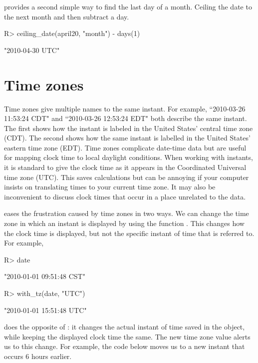 \documentclass[article]{jss}
\begin{document}
 provides a second simple way to find the last day of a month. Ceiling the date to the next month and then subtract a day.

\begin{CodeInput}
R> ceiling_date(april20, "month") - days(1)
\end{CodeInput}
\begin{CodeOutput}
[1] "2010-04-30 UTC"
\end{CodeOutput}


\section{Time zones}
\label{sec:tz}

Time zones give multiple names to the same instant. For example, ``2010-03-26 11:53:24 CDT" and ``2010-03-26 12:53:24 EDT" both describe the same instant. The first shows how the instant is labeled in the United States' central time zone (CDT). The second shows how the same instant is labelled in the United States' eastern time zone (EDT). Time zones complicate date-time data but are useful for mapping clock time to local daylight conditions. When working with instants, it is standard to give the clock time as it appears in the Coordinated Universal time zone (UTC).  This saves calculations but can be annoying if your computer insists on translating times to your current time zone.  It may also be inconvenient to discuss clock times that occur in a place unrelated to the data.

 eases the frustration caused by time zones in two ways. We can change the time zone in which an instant is displayed by using the function . This changes how the clock time is displayed, but not the specific instant of time that is referred to. For example,

\begin{CodeInput}
R> date
\end{CodeInput}
\begin{CodeOutput}
[1] "2010-01-01 09:51:48 CST"
\end{CodeOutput}

\begin{CodeInput}
R> with_tz(date, "UTC")
\end{CodeInput}
\begin{CodeOutput}
[1] "2010-01-01 15:51:48 UTC"
\end{CodeOutput}

 does the opposite of : it changes the actual instant of time saved in the object, while keeping the displayed clock time the same. The new time zone value alerts us to this change. For example, the code below moves us to a new instant that occurs 6 hours earlier.
\end{document}
